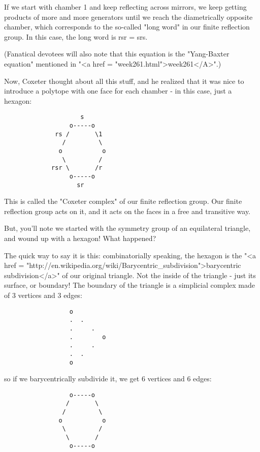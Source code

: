If we start with chamber 1 and keep reflecting across mirrors, 
we keep getting products of more and more generators until we 
reach the diametrically opposite chamber, which corresponds to 
the so-called "long word" in our finite reflection group.  In 
this case, the long word is rsr = srs.

(Fanatical devotees will also note that this equation is the
"Yang-Baxter equation" mentioned in "<a href = "week261.html">week261</A>".)

Now, Coxeter thought about all this stuff, and he realized
that it was nice to introduce a polytope with one face for 
each chamber - in this case, just a hexagon:
 
\begin{verbatim}
                     s
                  o-----o
              rs /       \1 
                /         \
               o           o
                \         / 
             rsr \       /r
                  o-----o
                    sr
\end{verbatim}
    
This is called the "Coxeter complex" of our finite reflection
group.  Our finite reflection group acts on it, and it acts
on the faces in a free and transitive way. 

But, you'll note we started with the symmetry group of an 
equilateral triangle, and wound up with a hexagon!  What happened?

The quick way to say it is this: combinatorially speaking,
the hexagon is the "<a href = "http://en.wikipedia.org/wiki/Barycentric_subdivision">barycentric subdivision</a>" of our original
triangle.  Not the inside of the triangle - just its surface,
or boundary!  The boundary of the triangle is a simplicial 
complex made of 3 vertices and 3 edges:
                     
\begin{verbatim}
                  o
                  .  .   
                  .     . 
                  .        o
                  .     .  
                  .  .
                  o
\end{verbatim}
    
so if we barycentrically subdivide it, we get 6 vertices
and 6 edges:
                     
\begin{verbatim}
                  o-----o
                 /       \
                /         \
               o           o
                \         / 
                 \       /
                  o-----o
\end{verbatim}
    
